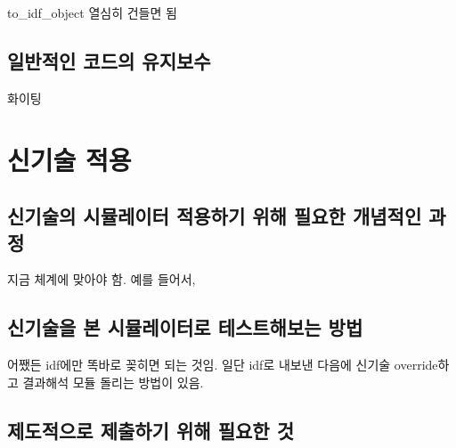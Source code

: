to\_idf\_object 열심히 건들면 됨


\section{일반적인 코드의 유지보수}

화이팅


\chapter{신기술 적용}

\section{신기술의 시뮬레이터 적용하기 위해 필요한 개념적인 과정}

지금 체계에 맞아야 함. 예를 들어서,


\section{신기술을 본 시뮬레이터로 테스트해보는 방법}

어쨌든 idf에만 똑바로 꽂히면 되는 것임. 일단 idf로 내보낸 다음에 신기술 override하고 결과해석 모듈 돌리는 방법이 있음.


\section{제도적으로 제출하기 위해 필요한 것}

